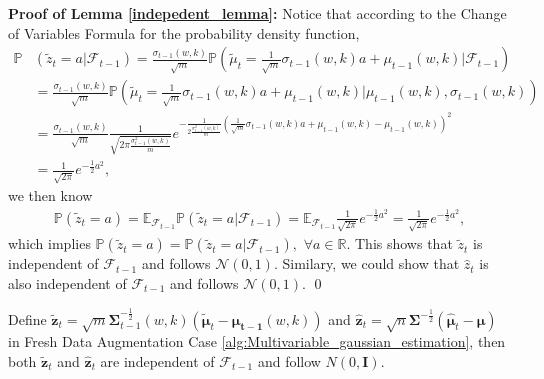 \noindent
\textbf{Proof of Lemma \ref{indepedent_lemma}:}
    Notice that according to the Change of Variables Formula for the probability density function,
\begin{align*}
\mathbb{P}&(\widetilde{z}_t=a|\mathcal{F}_{t-1})=\frac{\sigma_{t-1}(w,k)}{\sqrt{m}}\mathbb{P}(\widetilde{\mu}_t =\frac{1}{\sqrt{m}}\sigma_{t-1}(w,k)a+\mu_{t-1}(w,k)|\mathcal{F}_{t-1})\\&= \frac{\sigma_{t-1}(w,k)}{\sqrt
m} \mathbb{P}(
\widetilde{\mu}_t =\frac{1}{\sqrt{m}}\sigma_{t-1}(w,k)a+\mu_{t-1}(w,k)|\mu_{t-1}(w,k),\sigma_{t-1}(w,k)
) \\&=\frac{\sigma_{t-1}(w,k)}{\sqrt{m}}
\frac{1}{\sqrt
{2\pi \frac{\sigma^{2}_{t-1}(w,k)}{m} }
}e^{-\frac{1}{2 \frac{\sigma_{t-1}^2(w,k)}{m}    }   ( \frac{1}{\sqrt{m}}\sigma_{t-1}(w,k)a+\mu_{t-1}(w,k)   -\mu_{t-1}(w,k)   )^2      } \\ & =\frac{1}{\sqrt{2\pi}}e^{-\frac{1}{2}a^2},
\end{align*}
we then know 
\begin{align}
\mathbb{P}(\widetilde{z}_t=a)=\mathbb{E}_{\mathcal{F}_{t-1}}\mathbb{P}(\widetilde{z}_t=a | \mathcal{F}_{t-1})=\mathbb{E}_{\mathcal{F}_{t-1}}\frac{1}{\sqrt{2\pi}}e^{-\frac{1}{2}a^2}=\frac{1}{\sqrt{2\pi}}e^{-\frac{1}{2}a^2},
\end{align}
which implies $\mathbb{P}(\widetilde{z}_t=a)=\mathbb{P}(\widetilde{z}_t=a|\mathcal{F}_{t-1}),$ $\forall a \in \mathbb{R}$. This shows that $\widetilde{z}_t$ is independent of $\mathcal{F}_{t-1}$ and follows $\mathcal{N}(0,1)$. Similary, we could show that $\widehat{z}_t$ is also independent of $\mathcal{F}_{t-1}$ and follows $\mathcal{N}(0,1)$. \qed 

\begin{lemma}
\label{indepedent_lemma_multivariable}
Define $ \widetilde{\bm{z}}_t = \sqrt{m}\bm{\Sigma}^{-\frac{1}{2}
}_{t-1}(w,k)(\widetilde{\bm{\mu}}_t-\bm{\mu_{t-1}}(w,k)) $ and $\widehat{\bm{z}}_t = \sqrt{n} \bm{\Sigma}^{-\frac{1}{2}}(
{\widehat{\bm{\mu}}_t-\bm{\mu}})$ in Fresh Data Augmentation Case \ref{alg:Multivariable_gaussian_estimation}, then both $\widetilde{\bm z}_t$ and $\widehat{\bm z}_t$ are independent of $\mathcal{F}_{t-1}$ and follow $N(0,\mathbf{I})$.
\end{lemma}

